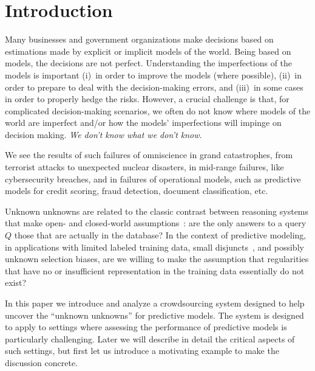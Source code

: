\section{Introduction}
\label{sec:intro}


Many businesses and government organizations make decisions based on
estimations made by explicit or implicit models of the world.  Being
based on models, the decisions are not perfect.  Understanding the
imperfections of the models is important (i)~in order to improve the
models (where possible), (ii)~in order to prepare to deal with the
decision-making errors, and (iii)~in some cases in order to properly
hedge the risks.  However, a crucial challenge is that, for 
complicated decision-making scenarios, we often do not know where 
models of the world are imperfect and/or how the models' imperfections
will impinge on decision making. \emph{We don't know what we don't know.}

We see the results of such failures of omniscience in grand
catastrophes, from terrorist attacks to unexpected nuclear disasters,
in mid-range failures, like cybersecurity breaches, and in failures of
operational models, such as predictive models for credit scoring,
fraud detection, document classification, etc.

Unknown unknowns are related to the classic contrast between reasoning
systems that make open- and closed-world
assumptions~\cite{Reiter77closedworld}: are the only answers to a query $Q$ those
that are actually in the database?  In the context of predictive
modeling, in applications with limited labeled training data, small
disjuncts~\cite{weiss10disjunct}, and possibly unknown selection biases, are
we willing to make the assumption that regularities that have no or
insufficient representation in the training data essentially do not
exist?


In this paper we introduce and analyze a crowdsourcing system designed
to help uncover the ``unknown unknowns'' for predictive models.  The
system is designed to apply to settings where assessing the
performance of predictive models is particularly challenging.  Later we
will describe in detail the critical aspects of such settings, but
first let us introduce a motivating example to make the discussion
concrete.

